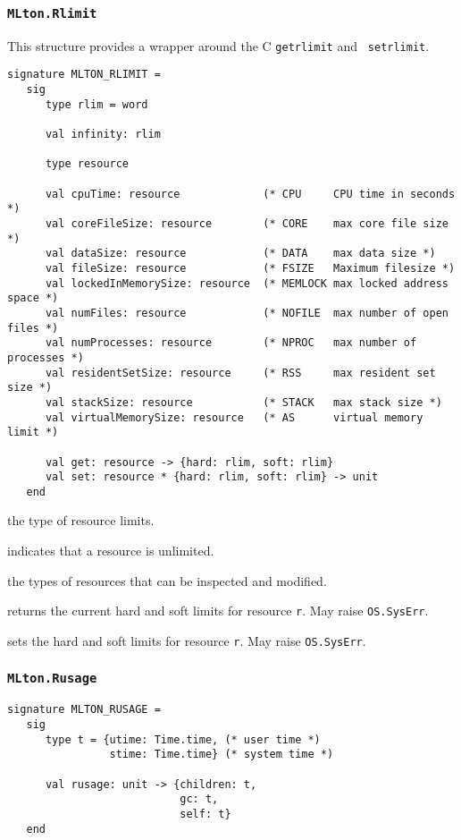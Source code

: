 \subsubsection{\tt MLton.Rlimit}
This structure provides a wrapper around the C {\tt getrlimit} and {\tt
setrlimit}.
\begin{verbatim}
signature MLTON_RLIMIT =
   sig
      type rlim = word
               
      val infinity: rlim

      type resource
               
      val cpuTime: resource             (* CPU     CPU time in seconds *)
      val coreFileSize: resource        (* CORE    max core file size *)
      val dataSize: resource            (* DATA    max data size *)
      val fileSize: resource            (* FSIZE   Maximum filesize *)
      val lockedInMemorySize: resource  (* MEMLOCK max locked address space *)
      val numFiles: resource            (* NOFILE  max number of open files *)  
      val numProcesses: resource        (* NPROC   max number of processes *)
      val residentSetSize: resource     (* RSS     max resident set size *)
      val stackSize: resource           (* STACK   max stack size *)
      val virtualMemorySize: resource   (* AS      virtual memory limit *)
      
      val get: resource -> {hard: rlim, soft: rlim}
      val set: resource * {hard: rlim, soft: rlim} -> unit
   end
\end{verbatim}

\begin{description}
the type of resource limits.

indicates that a resource is unlimited.

the types of resources that can be inspected and modified.

returns the current hard and soft limits for resource {\tt r}. May
raise {\tt OS.SysErr}.

sets the hard and soft limits for resource {\tt r}.  May raise {\tt OS.SysErr}.
\end{description}

\subsubsection{\tt MLton.Rusage}
\begin{verbatim}
signature MLTON_RUSAGE =
   sig
      type t = {utime: Time.time, (* user time *)
                stime: Time.time} (* system time *)
         
      val rusage: unit -> {children: t,
                           gc: t,
                           self: t}
   end
\end{verbatim}

